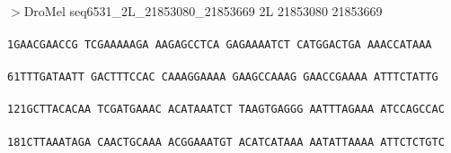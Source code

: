 \documentclass[11pt,twoside,reqno,a4paper]{article}
\begin{document}
\\
$>$DroMel	seq6531\_2L\_21853080\_21853669	2L	21853080	21853669 \\
 \\
\texttt{1\hspace*{3\charwidth}GAACGAACCG	TCGAAAAAGA	AAGAGCCTCA	GAGAAAATCT	CATGGACTGA	AAACCATAAA	\\
\hspace*{4\charwidth}\hspace*{1\charwidth}\hspace*{1\charwidth}\hspace*{1\charwidth}\hspace*{1\charwidth}\hspace*{1\charwidth}\hspace*{1\charwidth}\\
61\hspace*{2\charwidth}TTTGATAATT	GACTTTCCAC	CAAAGGAAAA	GAAGCCAAAG	GAACCGAAAA	ATTTCTATTG	\\
\hspace*{4\charwidth}\hspace*{1\charwidth}\hspace*{1\charwidth}\hspace*{1\charwidth}\hspace*{1\charwidth}\hspace*{1\charwidth}\hspace*{1\charwidth}\\
121\hspace*{1\charwidth}GCTTACACAA	TCGATGAAAC	ACATAAATCT	TAAGTGAGGG	AATTTAGAAA	ATCCAGCCAC	\\
\hspace*{4\charwidth}\hspace*{1\charwidth}\hspace*{1\charwidth}\hspace*{1\charwidth}\hspace*{1\charwidth}\hspace*{1\charwidth}\hspace*{1\charwidth}\\
181\hspace*{1\charwidth}CTTAAATAGA	CAACTGCAAA	ACGGAAATGT	ACATCATAAA	AATATTAAAA	ATTCTCTGTC	\\
\hspace*{4\charwidth}\hspace*{1\charwidth}\hspace*{1\charwidth}\hspace*{1\charwidth}\hspace*{1\charwidth}\hspace*{1\charwidth}\hspace*{1\charwidth}\\
}
\end{document}
